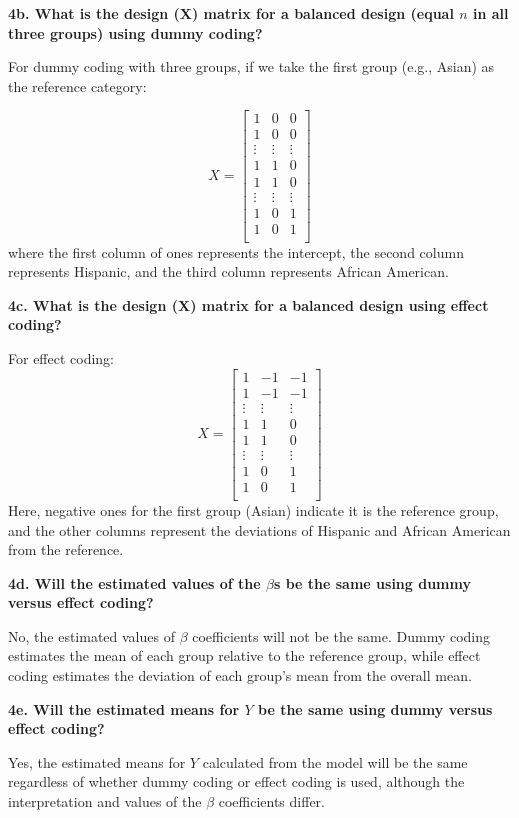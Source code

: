 \documentclass{article}
\begin{document}
\textbf{4b. What is the design (X) matrix for a balanced design (equal \( n \) in all three groups) using dummy coding?}

For dummy coding with three groups, if we take the first group (e.g., Asian) as the reference category:

\[
X = \begin{bmatrix}
1 & 0 & 0 \\
1 & 0 & 0 \\
\vdots & \vdots & \vdots \\
1 & 1 & 0 \\
1 & 1 & 0 \\
\vdots & \vdots & \vdots \\
1 & 0 & 1 \\
1 & 0 & 1 \\
\end{bmatrix}
\]
where the first column of ones represents the intercept, the second column represents Hispanic, and the third column represents African American.

\textbf{ 4c. What is the design (X) matrix for a balanced design using effect coding?}

For effect coding:
\[
X = \begin{bmatrix}
1 & -1 & -1 \\
1 & -1 & -1 \\
\vdots & \vdots & \vdots \\
1 & 1 & 0 \\
1 & 1 & 0 \\
\vdots & \vdots & \vdots \\
1 & 0 & 1 \\
1 & 0 & 1 \\
\end{bmatrix}
\]
Here, negative ones for the first group (Asian) indicate it is the reference group, and the other columns represent the deviations of Hispanic and African American from the reference.

\textbf{4d. Will the estimated values of the \( \beta \)s be the same using dummy versus effect coding?}

No, the estimated values of \( \beta \) coefficients will not be the same. Dummy coding estimates the mean of each group relative to the reference group, while effect coding estimates the deviation of each group's mean from the overall mean.

\textbf{4e. Will the estimated means for \( Y \) be the same using dummy versus effect coding?}

Yes, the estimated means for \( Y \) calculated from the model will be the same regardless of whether dummy coding or effect coding is used, although the interpretation and values of the \( \beta \) coefficients differ.
\end{document}
